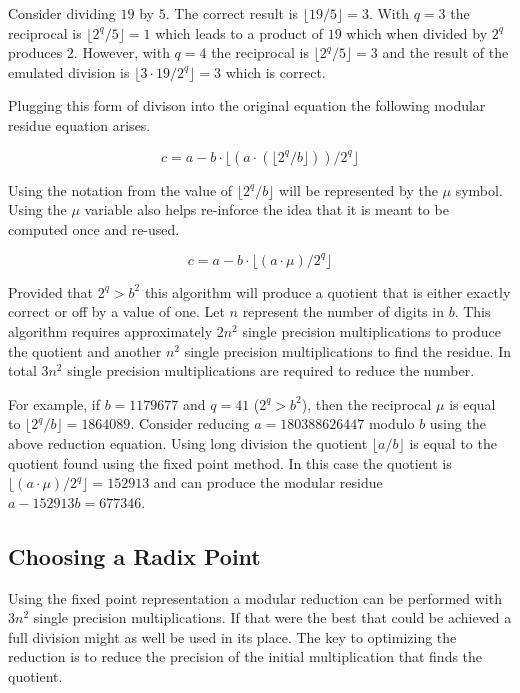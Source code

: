 \documentclass[b5paper]{book}
\begin{document}
Consider dividing $19$ by $5$.  The correct result is $\lfloor 19/5 \rfloor = 3$.  With $q = 3$ the reciprocal is $\lfloor 2^q/5 \rfloor = 1$ which
leads to a product of $19$ which when divided by $2^q$ produces $2$.  However, with $q = 4$ the reciprocal is $\lfloor 2^q/5 \rfloor = 3$ and
the result of the emulated division is $\lfloor 3 \cdot 19 / 2^q \rfloor = 3$ which is correct.  

Plugging this form of divison into the original equation the following modular residue equation arises.

\begin{equation}
c = a - b \cdot \lfloor (a \cdot (\lfloor 2^q / b \rfloor))/2^q \rfloor
\end{equation}

Using the notation from \cite{BARRETT} the value of $\lfloor 2^q / b \rfloor$ will be represented by the $\mu$ symbol.  Using the $\mu$
variable also helps re-inforce the idea that it is meant to be computed once and re-used.

\begin{equation}
c = a - b \cdot \lfloor (a \cdot \mu)/2^q \rfloor
\end{equation}

Provided that $2^q > b^2$ this algorithm will produce a quotient that is either exactly correct or off by a value of one.  Let $n$ represent
the number of digits in $b$.  This algorithm requires approximately $2n^2$ single precision multiplications to produce the quotient and 
another $n^2$ single precision multiplications to find the residue.  In total $3n^2$ single precision multiplications are required to 
reduce the number.  

For example, if $b = 1179677$ and $q = 41$ ($2^q > b^2$), then the reciprocal $\mu$ is equal to $\lfloor 2^q / b \rfloor = 1864089$.  Consider reducing
$a = 180388626447$ modulo $b$ using the above reduction equation.  Using long division the quotient $\lfloor a/b \rfloor$ is equal
to the quotient found using the fixed point method.  In this case the quotient is $\lfloor (a \cdot \mu)/2^q \rfloor = 152913$ and can
produce the modular residue $a - 152913b = 677346$.

\subsection{Choosing a Radix Point}
Using the fixed point representation a modular reduction can be performed with $3n^2$ single precision multiplications.  If that were the best
that could be achieved a full division might as well be used in its place.  The key to optimizing the reduction is to reduce the precision of
the initial multiplication that finds the quotient.  
\end{document}
